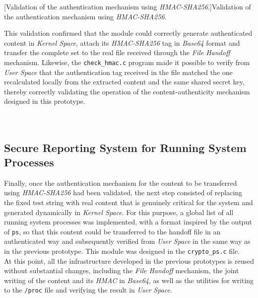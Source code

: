 \captionsetup{type=code,justification=centering,singlelinecheck=false}
[Validation of the authentication mechanism using \textit{HMAC-SHA256}.]{Validation of the authentication mechanism using \textit{HMAC-SHA256}.}
\label{cod:crypto_validation}
\vspace{\baselineskip}

This validation confirmed that the module could correctly generate authenticated content in \textit{Kernel Space}, attach its \textit{HMAC-SHA256} tag in \textit{Base64} format and transfer the complete set to the real file received through the \textit{File Handoff} mechanism.
Likewise, the \verb|check_hmac.c| program made it possible to verify from \textit{User Space} that the authentication tag received in the file matched the one recalculated locally from the extracted content and the same shared secret key, thereby correctly validating the operation of the content-authenticity mechanism designed in this prototype.\\\\

\

\subsection{Secure Reporting System for Running System Processes}
\label{sec:proto-report}

Finally, once the authentication mechanism for the content to be transferred using \textit{HMAC-SHA256} had been validated, the next step consisted of replacing the fixed test string with real content that is genuinely critical for the system and generated dynamically in \textit{Kernel Space}.
For this purpose, a global list of all running system processes was implemented, with a format inspired by the output of \texttt{ps}, so that this content could be transferred to the handoff file in an authenticated way and subsequently verified from \textit{User Space} in the same way as in the previous prototype.
This module was designed in the \verb|crypto_ps.c| file.\\

At this point, all the infrastructure developed in the previous prototypes is reused without substantial changes, including the \textit{File Handoff} mechanism, the joint writing of the content and its \textit{HMAC} in \textit{Base64}, as well as the utilities for writing to the \texttt{/proc} file and verifying the result in \textit{User Space}.\\


